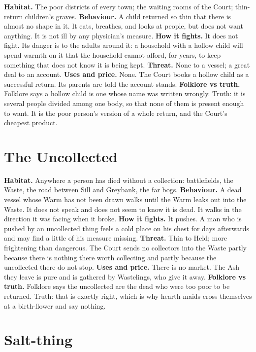 \documentclass{design/chronicle}
\begin{document}
\textbf{Habitat.} The poor districts of every town; the waiting rooms of the Court; thin-return children’s graves. \textbf{Behaviour.} A child returned so thin that there is almost no shape in it. It eats, breathes, and looks at people, but does not want anything. It is not ill by any physician’s measure. \textbf{How it fights.} It does not fight. Its danger is to the adults around it: a household with a hollow child will spend warmth on it that the household cannot afford, for years, to keep something that does not know it is being kept. \textbf{Threat.} None to a vessel; a great deal to an account. \textbf{Uses and price.} None. The Court books a hollow child as a successful return. Its parents are told the account stands. \textbf{Folklore vs truth.} Folklore says a hollow child is one whose name was written wrongly. Truth: it is several people divided among one body, so that none of them is present enough to want. It is the poor person’s version of a whole return, and the Court’s cheapest product.

\section*{The Uncollected}

\textbf{Habitat.} Anywhere a person has died without a collection: battlefields, the Waste, the road between Sill and Greybank, the far bogs. \textbf{Behaviour.} A dead vessel whose Warm has not been drawn walks until the Warm leaks out into the Waste. It does not speak and does not seem to know it is dead. It walks in the direction it was facing when it broke. \textbf{How it fights.} It pushes. A man who is pushed by an uncollected thing feels a cold place on his chest for days afterwards and may find a little of his measure missing. \textbf{Threat.} Thin to Held; more frightening than dangerous. The Court sends no collectors into the Waste partly because there is nothing there worth collecting and partly because the uncollected there do not stop. \textbf{Uses and price.} There is no market. The Ash they leave is pure and is gathered by Wastelings, who give it away. \textbf{Folklore vs truth.} Folklore says the uncollected are the dead who were too poor to be returned. Truth: that is exactly right, which is why hearth-maids cross themselves at a birth-flower and say nothing.

\section*{Salt-thing}
\end{document}
